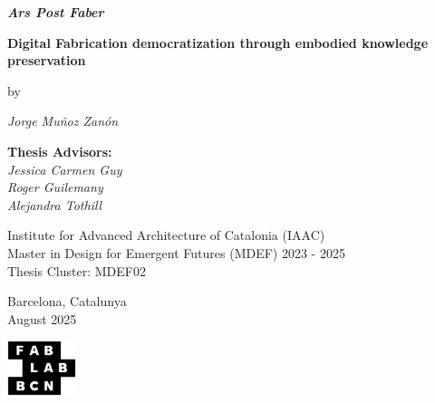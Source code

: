 \begin{titlepage}
\centering
\vspace*{2.5cm}

{\fontsize{24}{28}\selectfont\textbf{\textit{Ars Post Faber}}}

\vspace{0.3cm}

{\fontsize{18}{22}\selectfont\textbf{Digital Fabrication democratization through embodied knowledge preservation}}

\vspace{0.4cm}

{\fontsize{14}{16}\selectfont by}

\vspace{0.4cm}

{\fontsize{14}{20}\selectfont\textit{Jorge Muñoz Zanón}}

\vspace{1.5cm}

{\fontsize{14}{15}\selectfont
\textbf{Thesis Advisors:}\\[0.1cm]
\textit{Jessica Carmen Guy\\
Roger Guilemany\\
Alejandra Tothill}
}

\vspace{2cm}

{\fontsize{12}{15}\selectfont
Institute for Advanced Architecture of Catalonia (IAAC)\\[0.05cm]
Master in Design for Emergent Futures (MDEF) 2023 - 2025\\[0.05cm]
Thesis Cluster: MDEF02
}

\vspace{2cm}

{\fontsize{14}{16}\selectfont Barcelona, Catalunya\\[0.05cm]
August 2025}

\vspace{3cm}

\begin{center}
\hspace{1.5cm}
\includegraphics[height=1.6cm]{figures/logo/fablabbcn-logo.pdf}
\end{center}

\end{titlepage}